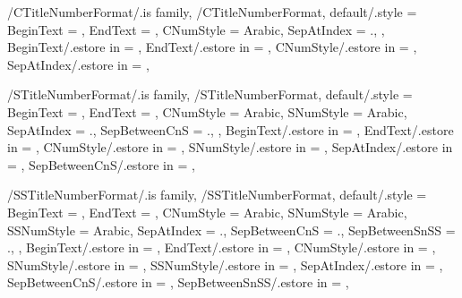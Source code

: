 
\pgfkeys
{
  /CTitleNumberFormat/.is family, /CTitleNumberFormat,
  default/.style =
  {
    BeginText = \empty,
    EndText = \empty,
    CNumStyle = Arabic,
    SepAtIndex = {.},
  },
  BeginText/.estore in = \GetCTitleNumberFormatBeginText,
  EndText/.estore in = \GetCTitleNumberFormatEndText,
  CNumStyle/.estore in = \GetCTitleNumberFormatCNumStyle,
  SepAtIndex/.estore in = \GetCTitleNumberFormatSepAtIndex,
} %

\newcommand\GetChapterTitleNumberFormatString{}
\newcommand\SetupChapterTitleNumberFormatString
{%
  \SetupTitleNumberFormatString{Chapter}%
  {%
    BeginText=\GetCTitleNumberFormatBeginText,%
    EndText=\GetCTitleNumberFormatEndText,%
    CNumStyle=\GetCTitleNumberFormatCNumStyle,%
    CCounterName=chapter,%
  }{\GetChapterTitleNumberFormatString}%
} %


\pgfkeys
{
  /STitleNumberFormat/.is family, /STitleNumberFormat,
  default/.style =
  {
    BeginText = \empty,
    EndText = \empty,
    CNumStyle = Arabic,
    SNumStyle = Arabic,
    SepAtIndex = {.}, %
    SepBetweenCnS = {.}, %
  },
  BeginText/.estore in = \GetSTitleNumberFormatBeginText,
  EndText/.estore in = \GetSTitleNumberFormatEndText,
  CNumStyle/.estore in = \GetSTitleNumberFormatCNumStyle,
  SNumStyle/.estore in = \GetSTitleNumberFormatSNumStyle,
  SepAtIndex/.estore in = \GetSTitleNumberFormatSepAtIndex,
  SepBetweenCnS/.estore in = \GetSTitleNumberFormatSepBetweenCnS,
} %

\newcommand\GetSectionTitleNumberFormatString{}
\newcommand\SetupSectionTitleNumberFormatString
{%
  \SetupTitleNumberFormatString{Section}%
  {%
    BeginText=\GetSTitleNumberFormatBeginText,%
    EndText=\GetSTitleNumberFormatEndText,%
    CNumStyle=\GetSTitleNumberFormatCNumStyle,%
    SNumStyle=\GetSTitleNumberFormatSNumStyle,%
    SepAtIndex=\GetSTitleNumberFormatSepAtIndex,%
    SepBetweenCnS=\GetSTitleNumberFormatSepBetweenCnS,%
    CCounterName=chapter,%
    SCounterName=section,%
  }{\GetSectionTitleNumberFormatString}%
} %


\pgfkeys
{
  /SSTitleNumberFormat/.is family, /SSTitleNumberFormat,
  default/.style =
  {
    BeginText = \empty,
    EndText = \empty,
    CNumStyle = Arabic,
    SNumStyle = Arabic,
    SSNumStyle = Arabic,
    SepAtIndex = {.}, %
    SepBetweenCnS = {.}, %
    SepBetweenSnSS = {.}, %
  },
  BeginText/.estore in = \GetSSTitleNumberFormatBeginText,
  EndText/.estore in = \GetSSTitleNumberFormatEndText,
  CNumStyle/.estore in = \GetSSTitleNumberFormatCNumStyle,
  SNumStyle/.estore in = \GetSSTitleNumberFormatSNumStyle,
  SSNumStyle/.estore in = \GetSSTitleNumberFormatSSNumStyle,
  SepAtIndex/.estore in = \GetSSTitleNumberFormatSepAtIndex,
  SepBetweenCnS/.estore in = \GetSSTitleNumberFormatSepBetweenCnS,
  SepBetweenSnSS/.estore in = \GetSSTitleNumberFormatSepBetweenSnSS,
} %

